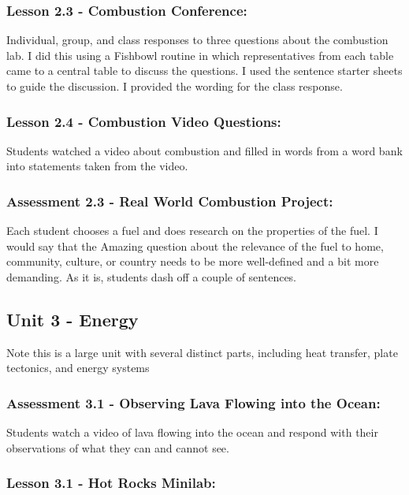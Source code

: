 \documentclass[11pt]{article}
\begin{document}
\subsubsection{Lesson 2.3 - Combustion Conference:}
\label{sec:orgcb4e752}

Individual, group, and class responses to three questions about the combustion lab. I did this using a Fishbowl routine in which
representatives from each table came to a central table to discuss the questions. I used
the sentence starter sheets to guide the discussion. I provided the wording for the class
response.


\subsubsection{Lesson 2.4 - Combustion Video Questions:}
\label{sec:org5cea352}

Students watched a video about combustion and filled in words from a word bank into statements taken from the video.


\subsubsection{Assessment 2.3 - Real World Combustion Project:}
\label{sec:org9c3b44c}

Each student chooses a fuel and does research on the properties of the fuel. I would say that the Amazing question about the
relevance of the fuel to home, community, culture, or country needs to be more well-defined and
a bit more demanding. As it is, students dash off a couple of sentences.


\subsection{Unit 3 - Energy}
\label{sec:org4bf55cd}

Note this is a large unit with several distinct parts, including heat transfer, plate tectonics, and energy systems

\subsubsection{Assessment 3.1 - Observing Lava Flowing into the Ocean:}
\label{sec:orgbf73011}

Students watch a video of lava flowing into the ocean and respond with their observations of what they can and cannot see.


\subsubsection{Lesson 3.1 - Hot Rocks Minilab:}
\label{sec:org0ce96d7}
\end{document}
